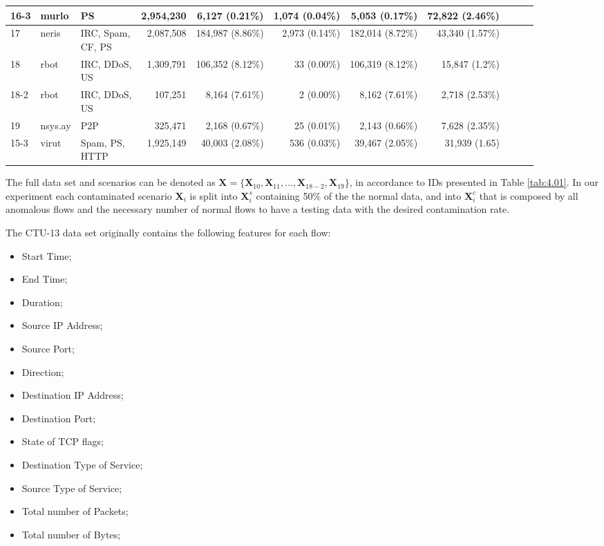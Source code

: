 \begin{table}[h!]
\begin{tabular}{| l | l | l | r | r | r | r | r | r | r | r | }
			16-3 & murlo &PS & 2,954,230 & 6,127 (0.21\%) & 1,074 (0.04\%) & 5,053 (0.17\%) &72,822 (2.46\%)\\ \hline
			17 & neris &\makecell[l]{IRC, Spam,\\CF, PS} & 2,087,508 & 184,987 (8.86\%) & 2,973 (0.14\%) & 182,014 (8.72\%) &43,340 (1.57\%)\\ \hline
			18 & rbot &\makecell[l]{IRC, DDoS,\\US} & 1,309,791 & 106,352 (8.12\%) & 33 (0.00\%) & 106,319 (8.12\%) &15,847 (1.2\%)\\ \hline
			18-2 & rbot &\makecell[l]{IRC, DDoS,\\US} & 107,251 & 8,164 (7.61\%) & 2 (0.00\%) & 8,162 (7.61\%) &2,718 (2.53\%)\\ \hline
			19 & nsys.ay &P2P & 325,471 & 2,168 (0.67\%) & 25 (0.01\%) & 2,143 (0.66\%) &7,628 (2.35\%)\\ \hline
			15-3 & virut &\makecell[l]{Spam, PS,\\HTTP} & 1,925,149 & 40,003 (2.08\%) & 536 (0.03\%) & 39,467 (2.05\%) &31,939 (1.65)\\ \hline
	\end{tabular}
\end{table}

The full data set and scenarios can be denoted as $\boldsymbol{X} = \{\boldsymbol{X}_{10}, \boldsymbol{X}_{11}, \ldots , \boldsymbol{X}_{18-2}, \boldsymbol{X}_{19}\}$, in accordance to IDs presented in Table \ref{tab:4.01}. In our experiment each contaminated scenario $\boldsymbol{X}_i$ is split into $\boldsymbol{X}_i^s$ containing 50\% of the the normal data, and into $\boldsymbol{X}_i^c$ that is composed by all anomalous flows and the necessary number of normal flows to have a testing data with the desired contamination rate.

The CTU-13 data set originally contains the following features for each flow:  

\begin{itemize}
	\item Start Time;
	\item End Time;
	\item Duration;
	\item Source IP Address;
	\item Source Port;
	\item Direction;
	\item Destination IP Address;
	\item Destination Port;
	\item State of TCP flags;
	\item Destination Type of Service;
	\item Source Type of Service;
	\item Total number of Packets;
	\item Total number of Bytes;
\end{itemize}


